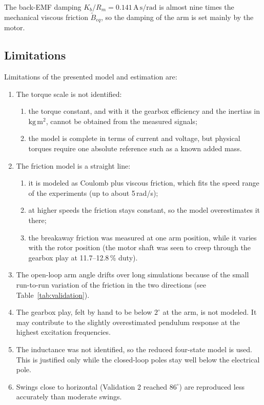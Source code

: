 \documentclass[a4paper,11pt]{article}
\begin{document}
The back-EMF damping $K_b/R_m = 0.141\,\mathrm{A\,s/rad}$ is almost nine times the mechanical viscous friction $\tilde B_{eq}$, so the damping of the arm is set mainly by the motor.

\subsection{Limitations}
Limitations of the presented model and estimation are:
\begin{enumerate}
  \item The torque scale is not identified:
  \begin{enumerate}
    \item the torque constant, and with it the gearbox efficiency and the inertias in $\mathrm{kg\,m^2}$, cannot be obtained from the measured signals;
    \item the model is complete in terms of current and voltage, but physical torques require one absolute reference such as a known added mass.
  \end{enumerate}
  \item The friction model is a straight line:
  \begin{enumerate}
    \item it is modeled as Coulomb plus viscous friction, which fits the speed range of the experiments (up to about 5\,rad/s);
    \item at higher speeds the friction stays constant, so the model overestimates it there;
    \item the breakaway friction was measured at one arm position, while it varies with the rotor position (the motor shaft was seen to creep through the gearbox play at 11.7--12.8\,\% duty).
  \end{enumerate}
  \item The open-loop arm angle drifts over long simulations because of the small run-to-run variation of the friction in the two directions (see Table~\ref{tab:validation}).
  \item The gearbox play, felt by hand to be below $2^\circ$ at the arm, is not modeled. It may contribute to the slightly overestimated pendulum response at the highest excitation frequencies.
  \item The inductance was not identified, so the reduced four-state model is used. This is justified only while the closed-loop poles stay well below the electrical pole.
  \item Swings close to horizontal (Validation 2 reached $86^\circ$) are reproduced less accurately than moderate swings.
\end{enumerate}
\end{document}
